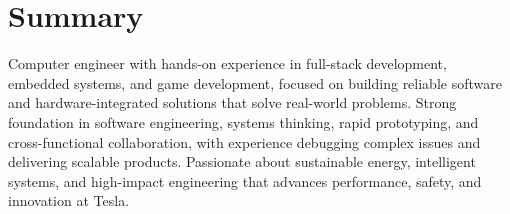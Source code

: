 \section{Summary}
Computer engineer with hands-on experience in full-stack development, embedded systems, and game development, focused on building reliable software and hardware-integrated solutions that solve real-world problems. Strong foundation in software engineering, systems thinking, rapid prototyping, and cross-functional collaboration, with experience debugging complex issues and delivering scalable products. Passionate about sustainable energy, intelligent systems, and high-impact engineering that advances performance, safety, and innovation at Tesla.